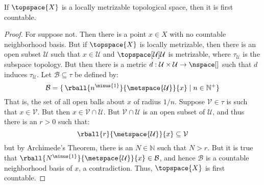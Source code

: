         \begin{theorem}
            \label{thm:Locally_Metrizable_is_First_Countable}%
            If $\topspace{X}$ is a locally metrizable topological space, then it
            is first countable.
        \end{theorem}
        \begin{proof}
            For suppose not. Then there is a point $x\in{X}$ with no countable
            neighborhood basis. But if $\topspace{X}$ is locally metrizable,
            then there is an open subset $\mathcal{U}$ such that
            $x\in\mathcal{U}$ and $\topspace[\mathcal{U}]{\mathcal{U}}$ is
            metrizable, where $\tau_{\mathcal{U}}$ is the subspace topology. But
            then there is a metric
            $d:\mathcal{U}\times\mathcal{U}\rightarrow\nspace[]$ such that
            $d$ induces $\tau_{\mathcal{U}}$. Let $\mathcal{B}\subseteq\tau$ be
            defined by:
            \begin{equation}
                \mathcal{B}=\{\,\rball{n^{\minus{1}}}{\metspace{\mathcal{U}}}{x}
                    \;|\;n\in\mathbb{N}^{+}\}
            \end{equation}
            That is, the set of all open balls about $x$ of radius $1/n$.
            Suppose $\mathcal{V}\in\tau$ is such that $x\in\mathcal{V}$. But
            then $x\in\mathcal{V}\cap\mathcal{U}$. But
            $\mathcal{V}\cap\mathcal{U}$ is an open subset of $\mathcal{U}$, and
            thus there is an $r>0$ such that:
            \begin{equation}
                \rball{r}{\metspace{\mathcal{U}}}{x}\subseteq\mathcal{V}
            \end{equation}
            but by Archimede's Theorem, there is an $N\in\mathbb{N}$ such that
            $N>r$. But it is true that
            $\rball{N^{\minus{1}}}{\metspace{\mathcal{U}}}{x}\in\mathcal{B}$,
            and hence $\mathcal{B}$ is a countable neighborhood basis of $x$,
            a contradiction. Thus, $\topspace{X}$ is first countable.
        \end{proof}
